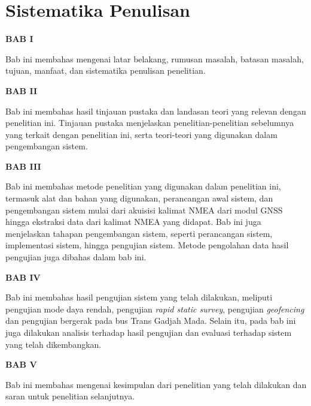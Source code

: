 \section{Sistematika Penulisan}
\textbf{BAB I}

Bab ini membahas mengenai latar belakang, rumusan masalah, batasan masalah, tujuan, manfaat, dan sistematika penulisan penelitian.

\textbf{BAB II}

Bab ini membahas hasil tinjauan pustaka dan landasan teori yang relevan dengan penelitian ini. Tinjauan pustaka menjelaskan penelitian-penelitian sebelumnya yang terkait dengan penelitian ini, serta teori-teori yang digunakan dalam pengembangan sistem.

\textbf{BAB III}

Bab ini membahas metode penelitian yang digunakan dalam penelitian ini, termasuk alat dan bahan yang digunakan, perancangan awal sistem, dan pengembangan sistem mulai dari akuisisi kalimat NMEA dari modul GNSS hingga ekstraksi data dari kalimat NMEA yang didapat. Bab ini juga menjelaskan tahapan pengembangan sistem, seperti perancangan sistem, implementasi sistem, hingga pengujian sistem. Metode pengolahan data hasil pengujian juga dibahas dalam bab ini.  

\textbf{BAB IV}

Bab ini membahas hasil pengujian sistem yang telah dilakukan, meliputi pengujian mode daya rendah, pengujian \textit{rapid static survey}, pengujian \textit{geofencing} dan pengujian bergerak pada bus Trans Gadjah Mada. Selain itu, pada bab ini juga dilakukan analisis terhadap hasil pengujian dan evaluasi terhadap sistem yang telah dikembangkan.

\textbf{BAB V}

Bab ini membahas mengenai kesimpulan dari penelitian yang telah dilakukan dan saran untuk penelitian selanjutnya.